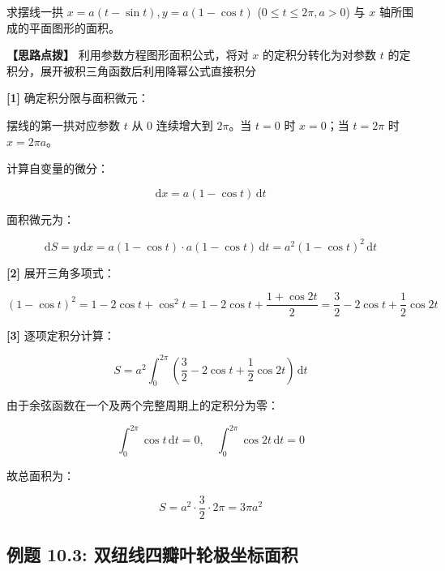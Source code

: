 \documentclass[11pt,a4paper,UTF8]{ctexart}
\begin{document}
求摆线一拱 $x = a(t - \sin t), y = a(1 - \cos t)$ ($0 \leqslant t \leqslant 2\pi, a > 0$) 与 $x$ 轴所围成的平面图形的面积。

\textbf{\color{DeepPurple}【思路点拨】} 利用参数方程图形面积公式，将对 $x$ 的定积分转化为对参数 $t$ 的定积分，展开被积三角函数后利用降幂公式直接积分


\begin{solbox}[分步推导与答题规范]
\textbf{[1]} 确定积分限与面积微元：

摆线的第一拱对应参数 $t$ 从 $0$ 连续增大到 $2\pi$。当 $t = 0$ 时 $x = 0$；当 $t = 2\pi$ 时 $x = 2\pi a$。

计算自变量的微分：


\begin{equation*}
\mathrm{d}x = a(1 - \cos t)\,\mathrm{d}t
\end{equation*}


面积微元为：


\begin{equation*}
\mathrm{d}S = y\,\mathrm{d}x = a(1 - \cos t) \cdot a(1 - \cos t)\,\mathrm{d}t = a^2(1 - \cos t)^2\,\mathrm{d}t
\end{equation*}


\textbf{[2]} 展开三角多项式：


\begin{equation*}
(1 - \cos t)^2 = 1 - 2\cos t + \cos^2 t = 1 - 2\cos t + \frac{1 + \cos 2t}{2} = \frac{3}{2} - 2\cos t + \frac{1}{2}\cos 2t
\end{equation*}


\textbf{[3]} 逐项定积分计算：


\begin{equation*}
S = a^2 \int_0^{2\pi} \left(\frac{3}{2} - 2\cos t + \frac{1}{2}\cos 2t\right)\,\mathrm{d}t
\end{equation*}


由于余弦函数在一个及两个完整周期上的定积分为零：


\begin{equation*}
\int_0^{2\pi} \cos t\,\mathrm{d}t = 0, \quad \int_0^{2\pi} \cos 2t\,\mathrm{d}t = 0
\end{equation*}


故总面积为：


\begin{equation*}
S = a^2 \cdot \frac{3}{2} \cdot 2\pi = 3\pi a^2
\end{equation*}

\end{solbox}


\subsection{例题 10.3: 双纽线四瓣叶轮极坐标面积}
\end{document}
